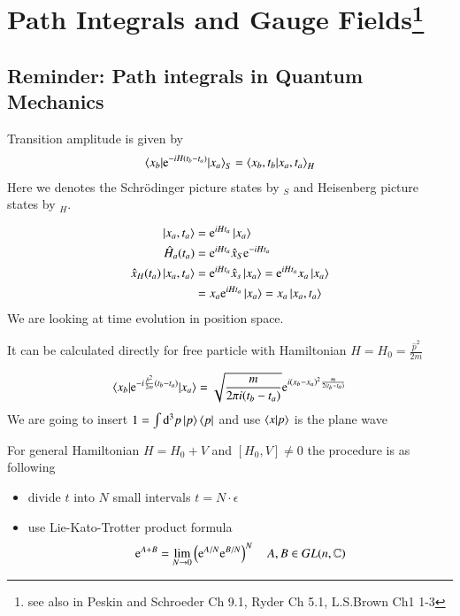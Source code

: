 \chapter[Path Integrals and Gauge Fields]{Path Integrals and Gauge Fields\footnote{see also in  Peskin and Schroeder Ch 9.1,  Ryder Ch 5.1, L.S.Brown Ch1 1-3}}

\section{Reminder: Path integrals in Quantum Mechanics}
Transition amplitude is given by 
\begin{align}
   \braket{x_b | \mathrm{e}^{-iH(t_b - t_a)} | x_a}_{S} = \braket{x_b, t_b | x_a, t_a}_{H} 
\end{align}
Here we denotes the Schrödinger picture states by ${}_S$ and Heisenberg picture states by ${}_H$.

\begin{align}
   \ket{x_a, t_a} &= \mathrm{e}^{iHt_a} \ket{x_a} \\
   \hat{H}_a (t_a) &= \mathrm{e}^{iHt_a} \hat{x}_S \mathrm{e}^{-iHt_a} \\
   \hat{x}_H(t_a) \ket{x_a, t_a} &= \mathrm{e}^{iHt_a} \hat{x}_s \ket{x_a} = \mathrm{e}^{iHt_a} x_a \ket{x_a}  \notag\\
                                 &= x_a \mathrm{e}^{iHt_a} \ket{x_a} = x_a \ket{x_a, t_a}
\end{align}
We are looking at time evolution in position space.

It can be calculated directly for free particle with Hamiltonian $H = H_0 = \frac{\hat{p}^2}{2m}$

\begin{align}
   \braket{x_b | \mathrm{e}^{-i \frac{\hat{p}^2}{2m}(t_b - t_a)} | x_a} = \sqrt{\frac{m}{2\pi i (t_b - t_a)}} \mathrm{e}^{i(x_b - x_a)^2 \frac{m}{2(t_b - t_a)}}
\end{align}
We are going to insert $1 = \int \dd[3]{p} \ket{p}\bra{p}$ and use $\braket{x | p}$ is the plane wave

For general Hamiltonian $H = H_0 + V$ and $ \left[ H_0, V \right] \neq 0 $ the procedure is as following
\begin{itemize}
   \item divide $t$ into $N$ small intervals $t = N\cdot \epsilon$
   \item use Lie-Kato-Trotter product formula
      \begin{align}
         \mathrm{e}^{A+B} = \lim_{N \rightarrow 0} \left( \mathrm{e}^{A/N} \mathrm{e}^{B/N} \right)^N \quad A, B \in GL(n, \mathbb{C})
      \end{align}
\end{itemize}

